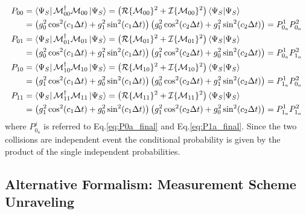 \documentclass[a4paper,12pt]{article}
\begin{document}
\begin{align}
	P_{00} &= \bra{\Psi_{S}} \mathcal{M}_{00}^{\dagger} \mathcal{M}_{00} \ket{\Psi_{S}} = \left( \mathcal{R}\{ \mathcal{M}_{00} \}^2 + \mathcal{I}\{ \mathcal{M}_{00} \}^2 \right) \braket{\Psi_{S} | \Psi_{S}} \notag \\
	&= \left(g_{0}^{2} \cos^{2}(c_{1} \Delta t) + g_{1}^{2} \sin^{2}(c_{1} \Delta t) \right) \left(g_{0}^{2} \cos^{2}(c_{2} \Delta t) + g_{1}^{2} \sin^{2}(c_{2} \Delta t) \right) = P_{0_{a}}^{1} P_{0_{a}}^{2}  \label{eq:P00_complete} \\
	P_{01} &= \bra{\Psi_{S}} \mathcal{M}_{01}^{\dagger} \mathcal{M}_{01} \ket{\Psi_{S}} = \left( \mathcal{R}\{ \mathcal{M}_{01} \}^2 + \mathcal{I}\{ \mathcal{M}_{01} \}^2 \right) \braket{\Psi_{S} | \Psi_{S}} \notag \\
	&= \left(g_{0}^{2} \cos^{2}(c_{1} \Delta t) + g_{1}^{2} \sin^{2}(c_{1} \Delta t) \right) \left(g_{1}^{2} \cos^{2}(c_{2} \Delta t) + g_{0}^{2} \sin^{2}(c_{2} \Delta t) \right) = P_{0_{a}}^{1} P_{1_{a}}^{2}  \label{eq:P01_complete} \\
	P_{10} &= \bra{\Psi_{S}} \mathcal{M}_{10}^{\dagger} \mathcal{M}_{10} \ket{\Psi_{S}} = \left( \mathcal{R}\{ \mathcal{M}_{10} \}^2 + \mathcal{I}\{ \mathcal{M}_{10} \}^2 \right) \braket{\Psi_{S} | \Psi_{S}} \notag \\
	&= \left(g_{1}^{2} \cos^{2}(c_{1} \Delta t) + g_{0}^{2} \sin^{2}(c_{1} \Delta t) \right) \left(g_{0}^{2} \cos^{2}(c_{2} \Delta t) + g_{1}^{2} \sin^{2}(c_{2} \Delta t) \right) = P_{1_{a}}^{1} P_{0_{a}}^{2}  \label{eq:P10_complete} \\
	P_{11} &= \bra{\Psi_{S}} \mathcal{M}_{11}^{\dagger} \mathcal{M}_{11} \ket{\Psi_{S}} = \left( \mathcal{R}\{ \mathcal{M}_{11} \}^2 + \mathcal{I}\{ \mathcal{M}_{11} \}^2 \right) \braket{\Psi_{S} | \Psi_{S}} \notag \\
	&= \left(g_{1}^{2} \cos^{2}(c_{1} \Delta t) + g_{0}^{2} \sin^{2}(c_{1} \Delta t) \right) \left(g_{1}^{2} \cos^{2}(c_{2} \Delta t) + g_{0}^{2} \sin^{2}(c_{2} \Delta t) \right) = P_{1_{a}}^{1} P_{1_{a}}^{2}  \label{eq:P11_complete}
\end{align}
where $ P_{0_{a}}^{j} $ is referred to Eq.\ref{eq:P0a_final} and Eq.\ref{eq:P1a_final}. Since the two collisions are independent event the conditional probability is given by the product of the single independent probabilities.

\subsection{Alternative Formalism: Measurement Scheme Unraveling}
\end{document}
